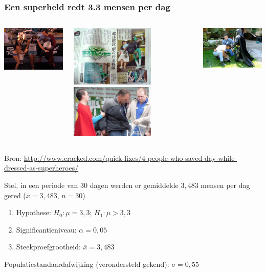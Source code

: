 \documentclass{beamer}
\begin{document}
\begin{frame}
  \frametitle{Een superheld redt 3.3 mensen per dag}

  \begin{columns}
    \centering
    \includegraphics[width=4cm]{img/les5-gered1}

    \includegraphics[width=4cm]{img/les5-gered2}
    \centering
    \includegraphics[width=4cm]{img/les5-gered3}

    \includegraphics[width=4cm]{img/les5-gered4}
  \end{columns}

  \vfill
  \centering
  \small{Bron: \url{http://www.cracked.com/quick-fixes/4-people-who-saved-day-while-dressed-as-superheroes/}}
\end{frame}

\begin{frame}
  Stel, in een periode van 30 dagen werden er gemiddelde $3,483$ mensen per dag gered ($\overline{x}=3,483$, $n=30$)
  \vfill
  \begin{enumerate}
    \item Hypothese: $H_0: \mu = 3,3$; $H_1: \mu > 3,3$
    \item Significantieniveau: $\alpha = 0,05$
    \item Steekproefgrootheid: $\overline{x} = 3,483$
  \end{enumerate}
  \vfill
  Populatiestandaardafwijking (verondersteld gekend): $\sigma = 0,55$
\end{frame}
\end{document}
